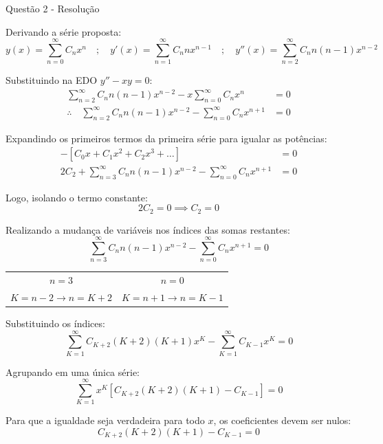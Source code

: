 \documentclass[8pt,aspectratio = 169]{beamer}
\begin{document}
\begin{frame}[allowframebreaks]{Questão 2 - Resolução}
    
    Derivando a série proposta:
    \[ 
    y(x) = \sum_{n=0}^{\infty} C_n x^n \quad ; \quad 
    y'(x) = \sum_{n=1}^{\infty} C_n n x^{n-1} \quad ; \quad 
    y''(x) = \sum_{n=2}^{\infty} C_n n(n-1) x^{n-2} 
    \]

    Substituindo na EDO $y'' - xy = 0$:
    \begin{align*}
        \sum_{n=2}^{\infty} C_n n(n-1) x^{n-2} - x \sum_{n=0}^{\infty} C_n x^n &= 0 \\[1ex]
        \therefore \quad \sum_{n=2}^{\infty} C_n n(n-1) x^{n-2} - \sum_{n=0}^{\infty} C_n x^{n+1} &= 0 
    \end{align*}

    Expandindo os primeiros termos da primeira série para igualar as potências:
    \begin{align*}
        [C_2(2)(1) + C_3(3)(2)x + \dots] - [C_0 x + C_1 x^2 + C_2 x^3 + \dots] &= 0 \\[1ex]
        2C_2 + \sum_{n=3}^{\infty} C_n n(n-1) x^{n-2} - \sum_{n=0}^{\infty} C_n x^{n+1} &= 0 
    \end{align*}

    \framebreak 

    Logo, isolando o termo constante:
    \[ 2C_2 = 0 \implies \boxed{C_2 = 0} \]
    
    Realizando a mudança de variáveis nos índices das somas restantes:
    \[ \sum_{n=3}^{\infty} C_n n(n-1) x^{n-2} - \sum_{n=0}^{\infty} C_n x^{n+1} = 0 \]

    \begin{center}
        \begin{tabular}{cc}
            $n=3$ & $n=0$ \\
            $K = n - 2 \rightarrow n = K + 2$ & $K = n + 1 \rightarrow n = K - 1$
        \end{tabular}
    \end{center}

    Substituindo os índices:
    \[ \sum_{K=1}^{\infty} C_{K+2} (K+2)(K+1) x^K - \sum_{K=1}^{\infty} C_{K-1} x^K = 0  \]

    Agrupando em uma única série:
    \[ \sum_{K=1}^{\infty} x^K [ C_{K+2} (K+2)(K+1) - C_{K-1} ] = 0 \]

    \framebreak 

    Para que a igualdade seja verdadeira para todo $x$, os coeficientes devem ser nulos:
    \[ C_{K+2} (K+2)(K+1) - C_{K-1} = 0 \]


\end{frame}
\end{document}

